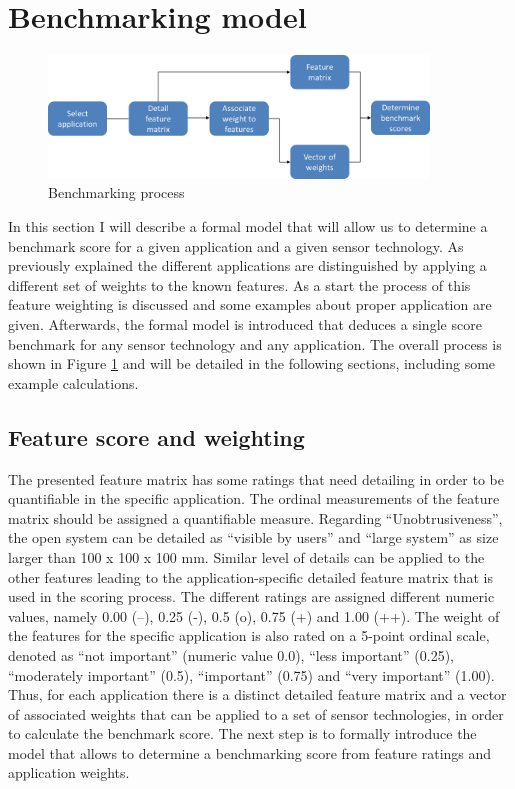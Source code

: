 \section{Benchmarking model}
\begin{figure}[h]
\centering
\includegraphics[width=0.9\textwidth]{images/benchmark_process}
\caption{Benchmarking process}
\label{fig:bench_process}
\end{figure}
In this section I will describe a formal model that will allow us to determine a benchmark score for a given application and a given sensor technology. As previously explained the different applications are distinguished by applying a different set of weights to the known features. As a start the process of this feature weighting is discussed and some examples about proper application are given. Afterwards, the formal model is introduced that deduces a single score benchmark for any sensor technology and any application. The overall process is shown in Figure \ref{fig:bench_process} and will be detailed in the following sections, including some example calculations.

\subsection{Feature score and weighting}
\label{ch:bench_sec_featscore}
The presented feature matrix has some ratings that need detailing in order to be quantifiable in the specific application. The ordinal measurements of the feature matrix should be assigned a quantifiable measure. Regarding “Unobtrusiveness”, the open system can be detailed as “visible by users” and “large system” as size larger than 100 x 100 x 100 mm. Similar level of details can be applied to the other features leading to the application-specific detailed feature matrix that is used in the scoring process. The different ratings are assigned different numeric values, namely 0.00 (--), 0.25 (-), 0.5 (o), 0.75 (+) and 1.00 (++). The weight of the features for the specific application is also rated on a 5-point ordinal scale, denoted as “not important” (numeric value 0.0), “less important” (0.25), “moderately important” (0.5), “important” (0.75) and “very important” (1.00). Thus, for each application there is a distinct detailed feature matrix and a vector of associated weights that can be applied to a set of sensor technologies, in order to calculate the benchmark score. The next step is to formally introduce the model that allows to determine a benchmarking score from feature ratings and application weights.

